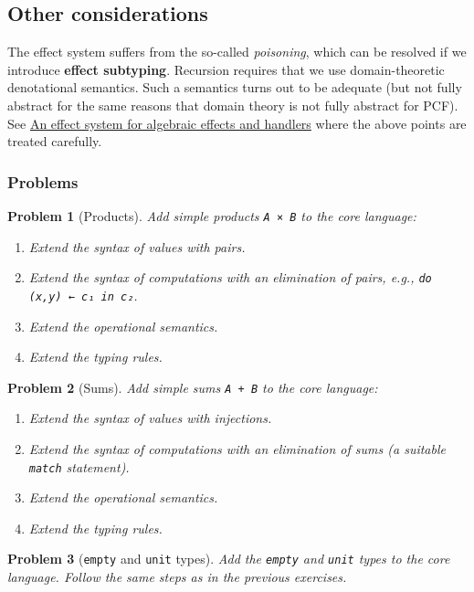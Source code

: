 \documentclass{article}
\newtheorem{problem}{Problem}[section]}
\begin{document}
\subsection{Other considerations}

The effect system suffers from the so-called \emph{poisoning}, which can be
resolved if we introduce \textbf{effect subtyping}. Recursion requires that we
use domain-theoretic denotational semantics. Such a semantics turns out to be
adequate (but not fully abstract for the same reasons that domain theory is not
fully abstract for PCF). See \href{https://arxiv.org/abs/1306.6316}{An effect
  system for algebraic effects and handlers} where the above points are treated
carefully.

\subsubsection{Problems}

\begin{problem}[Products]

Add simple products \lstinline{A × B} to the core language:
%
\begin{enumerate}
\item Extend the syntax of values with pairs.
\item Extend the syntax of computations with an elimination of pairs, e.g., \lstinline{do (x,y) ← c₁ in c₂}.
\item Extend the operational semantics.
\item Extend the typing rules.
\end{enumerate}
\end{problem}

\begin{problem}[Sums]

Add simple sums \lstinline{A + B} to the core language:
%
\begin{enumerate}
\item Extend the syntax of values with injections.
\item Extend the syntax of computations with an elimination of sums (a suitable \lstinline{match} statement).
\item Extend the operational semantics.
\item Extend the typing rules.
\end{enumerate}
\end{problem}

\begin{problem}[\lstinline{empty} and \lstinline{unit} types]
Add the \lstinline{empty} and \lstinline{unit} types to the core language. Follow the same steps as
in the previous exercises.
\end{problem}
\end{document}
